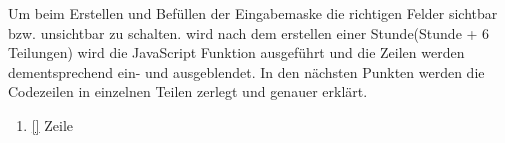 Um beim Erstellen und Befüllen der Eingabemaske die richtigen Felder sichtbar bzw. unsichtbar zu schalten. wird nach dem erstellen einer Stunde(Stunde + 6 Teilungen) wird die JavaScript Funktion ausgeführt und die Zeilen werden dementsprechend ein- und ausgeblendet.
In den nächsten Punkten werden die Codezeilen in einzelnen Teilen zerlegt und genauer erklärt.
\begin{enumerate}
\item \autoref{} Zeile






\end{enumerate}



